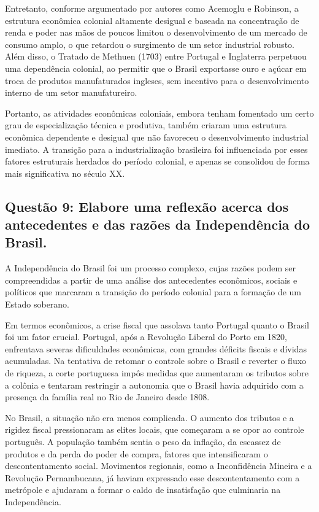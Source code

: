 \documentclass[a4paper,12pt]{article}[abntex2]
\begin{document}
Entretanto, conforme argumentado por autores como Acemoglu e Robinson, a estrutura econômica colonial altamente desigual e baseada na concentração de renda e poder nas mãos de poucos limitou o desenvolvimento de um mercado de consumo amplo, o que retardou o surgimento de um setor industrial robusto. Além disso, o Tratado de Methuen (1703) entre Portugal e Inglaterra perpetuou uma dependência colonial, ao permitir que o Brasil exportasse ouro e açúcar em troca de produtos manufaturados ingleses, sem incentivo para o desenvolvimento interno de um setor manufatureiro.

Portanto, as atividades econômicas coloniais, embora tenham fomentado um certo grau de especialização técnica e produtiva, também criaram uma estrutura econômica dependente e desigual que não favoreceu o desenvolvimento industrial imediato. A transição para a industrialização brasileira foi influenciada por esses fatores estruturais herdados do período colonial, e apenas se consolidou de forma mais significativa no século XX. 

\subsection{\textbf{Questão 9: Elabore uma reflexão acerca dos antecedentes e das razões da Independência do Brasil.}}

A Independência do Brasil foi um processo complexo, cujas razões podem ser compreendidas a partir de uma análise dos antecedentes econômicos, sociais e políticos que marcaram a transição do período colonial para a formação de um Estado soberano.

Em termos econômicos, a crise fiscal que assolava tanto Portugal quanto o Brasil foi um fator crucial. Portugal, após a Revolução Liberal do Porto em 1820, enfrentava severas dificuldades econômicas, com grandes déficits fiscais e dívidas acumuladas. Na tentativa de retomar o controle sobre o Brasil e reverter o fluxo de riqueza, a corte portuguesa impôs medidas que aumentaram os tributos sobre a colônia e tentaram restringir a autonomia que o Brasil havia adquirido com a presença da família real no Rio de Janeiro desde 1808.

No Brasil, a situação não era menos complicada. O aumento dos tributos e a rigidez fiscal pressionaram as elites locais, que começaram a se opor ao controle português. A população também sentia o peso da inflação, da escassez de produtos e da perda do poder de compra, fatores que intensificaram o descontentamento social. Movimentos regionais, como a Inconfidência Mineira e a Revolução Pernambucana, já haviam expressado esse descontentamento com a metrópole e ajudaram a formar o caldo de insatisfação que culminaria na Independência.
\end{document}
